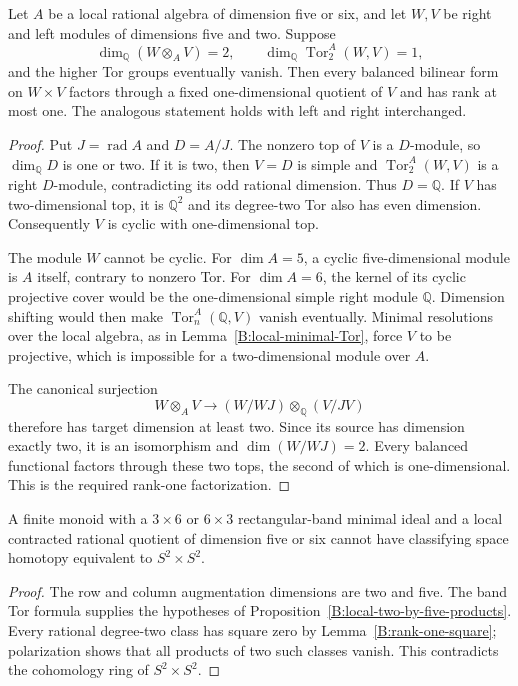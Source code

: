 \begin{proposition}\label{B:local-two-by-five-products}
Let $A$ be a local rational algebra of dimension five or six, and
let $W,V$ be right and left modules of dimensions five and two.
Suppose
\[
 \dim_{\mathbb Q}(W\otimes_A V)=2,\qquad
 \dim_{\mathbb Q}\operatorname{Tor}_2^A(W,V)=1,
\]
and the higher Tor groups eventually vanish.  Then every balanced
bilinear form on $W\times V$ factors through a fixed
one-dimensional quotient of $V$ and has rank at most one.
The analogous statement holds with left and right interchanged.
\end{proposition}
\begin{proof}
Put $J=\operatorname{rad}A$ and $D=A/J$.  The nonzero top of $V$
is a $D$-module, so $\dim_{\mathbb Q}D$ is one or two.  If it is
two, then $V=D$ is simple and $\operatorname{Tor}_2^A(W,V)$ is
a right $D$-module, contradicting its odd rational dimension.
Thus $D=\mathbb Q$.  If $V$ has two-dimensional top, it is
$\mathbb Q^2$ and its degree-two Tor also has even dimension.
Consequently $V$ is cyclic with one-dimensional top.

The module $W$ cannot be cyclic.  For $\dim A=5$, a cyclic
five-dimensional module is $A$ itself, contrary to nonzero Tor.
For $\dim A=6$, the kernel of its cyclic projective cover would
be the one-dimensional simple right module $\mathbb Q$.
Dimension shifting would then make
$\operatorname{Tor}^A_n(\mathbb Q,V)$ vanish eventually.
Minimal resolutions over the local algebra, as in
Lemma~\ref{B:local-minimal-Tor}, force $V$ to be projective,
which is impossible for a two-dimensional module over $A$.

The canonical surjection
\[
 W\otimes_A V\longrightarrow
 (W/WJ)\otimes_{\mathbb Q}(V/JV)
\]
therefore has target dimension at least two.  Since its source
has dimension exactly two, it is an isomorphism and
$\dim(W/WJ)=2$.  Every balanced functional factors through
these two tops, the second of which is one-dimensional.
This is the required rank-one factorization.
\end{proof}

\begin{corollary}\label{B:local-three-by-six-product}
A finite monoid with a $3\times6$ or $6\times3$ rectangular-band
minimal ideal and a local contracted rational quotient of
dimension five or six cannot have classifying space homotopy
equivalent to $S^2\times S^2$.
\end{corollary}
\begin{proof}
The row and column augmentation dimensions are two and five.
The band Tor formula supplies the hypotheses of
Proposition~\ref{B:local-two-by-five-products}.  Every rational
degree-two class has square zero by
Lemma~\ref{B:rank-one-square}; polarization shows that all
products of two such classes vanish.  This contradicts the
cohomology ring of $S^2\times S^2$.
\end{proof}
